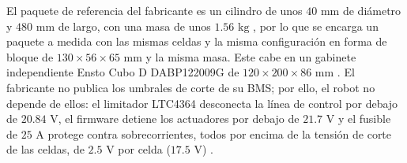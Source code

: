 \documentclass[../../General.tex]{subfiles}
\begin{document}
El paquete de referencia del fabricante es un cilindro de unos $40\text{ mm}$ de diámetro y $480\text{ mm}$ de largo, con una masa de unos $1.56\text{ kg}$ \citep{cmbatteries_7s3p}, por lo que se encarga un paquete a medida con las mismas celdas y la misma configuración en forma de bloque de $130 \times 56 \times 65\text{ mm}$ y la misma masa. Este cabe en un gabinete independiente Ensto Cubo D DABP122009G de $120 \times 200 \times 86\text{ mm}$ \citep{ensto_catalog}. El fabricante no publica los umbrales de corte de su BMS; por ello, el robot no depende de ellos: el limitador LTC4364 desconecta la línea de control por debajo de $20.84\text{ V}$, el firmware detiene los actuadores por debajo de $21.7\text{ V}$ y el fusible de $25\text{ A}$ protege contra sobrecorrientes, todos por encima de la tensión de corte de las celdas, de $2.5\text{ V}$ por celda ($17.5\text{ V}$) \citep{samsung_30q}.
\end{document}
